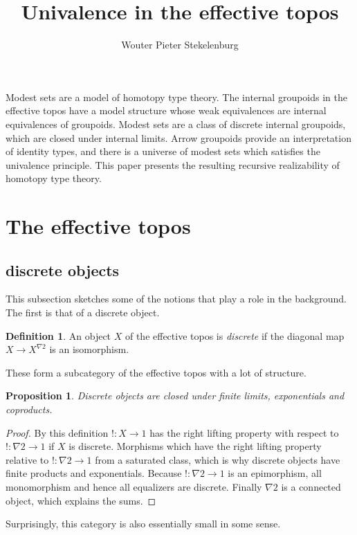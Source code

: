 \documentclass{amsart}
\title{Univalence in the effective topos}
\author[W. P. Stekelenburg]{Wouter Pieter Stekelenburg}
\theoremstyle{plain}
\newtheorem{prop}[theorem]{Proposition}
\theoremstyle{definition}
\newtheorem{defin}[theorem]{Definition}
\begin{document}
\maketitle

Modest sets are a model of homotopy type theory. The internal groupoids in the effective topos have a model structure whose weak equivalences are internal equivalences of groupoids. Modest sets are a class of discrete internal groupoids, which are closed under internal limits. Arrow groupoids provide an interpretation of identity types, and there is a universe of modest sets which satisfies the univalence principle. This paper presents the resulting recursive realizability of homotopy type theory.

\section{The effective topos}

\subsection{discrete objects}
This subsection sketches some of the notions that play a role in the background. The first is that of a discrete object.

\begin{defin} An object $X$ of the effective topos is \emph{discrete} if the diagonal map $X\to X^{\nabla 2}$ is an isomorphism. \end{defin}

These form a subcategory of the effective topos with a lot of structure.

\begin{prop} Discrete objects are closed under finite limits, exponentials and coproducts. \end{prop}

\begin{proof} By this definition $!:X\to 1$ has the right lifting property with respect to $!:\nabla 2 \to 1$ if $X$ is discrete. 
Morphisms which have the right lifting property relative to $!:\nabla 2\to 1$ from a saturated class, which is why discrete objects have finite products and exponentials. Because $!:\nabla 2\to 1$ is an epimorphism, all monomorphism and hence all equalizers are discrete. Finally $\nabla 2$ is a connected object, which explains the sums. \end{proof}

Surprisingly, this category is also essentially small in some sense.
\end{document}
